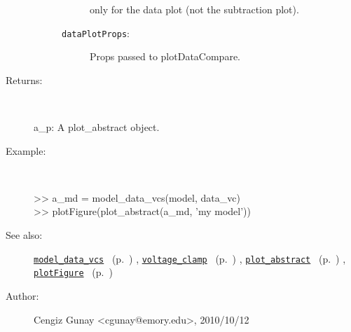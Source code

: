 \begin{description}
\begin{description}
\begin{description}
only for the data plot (not the subtraction plot).
\item[\texttt{dataPlotProps}:]
 Props passed to plotDataCompare.
\end{description}%
\end{description}%
%
\item[Returns:
]~

   a\_p: A plot\_abstract object.
%
\item[Example:]~
\begin{lyxcode} >> a\_md = model\_data\_vcs(model, data\_vc)
\\%
 >> plotFigure(plot\_abstract(a\_md, 'my model'))
\\%
\end{lyxcode}
%
\item[See also:]%
\hyperlink{ref_model_data_vcs}{\texttt{model\_data\_vcs}}%
\ (p.~\pageref{ref_model_data_vcs})%
%
, \hyperlink{ref_voltage_clamp}{\texttt{voltage\_clamp}}%
\ (p.~\pageref{ref_voltage_clamp})%
%
, \hyperlink{ref_plot_abstract}{\texttt{plot\_abstract}}%
\ (p.~\pageref{ref_plot_abstract})%
%
, \hyperlink{ref_plotFigure}{\texttt{plotFigure}}%
\ (p.~\pageref{ref_plotFigure})%
%
%
\item[Author:]%
Cengiz Gunay <cgunay@emory.edu>, 2010/10/12
%
\end{description}
\methodline%
